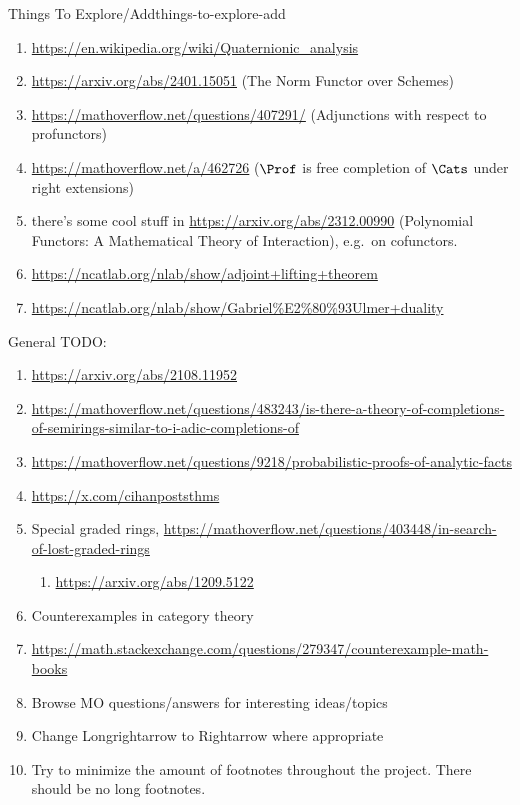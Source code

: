 \begin{remark}{Things To Explore/Add}{things-to-explore-add}
\begin{enumerate}
        \item \url{https://en.wikipedia.org/wiki/Quaternionic\_analysis}
        \item \url{https://arxiv.org/abs/2401.15051} (The Norm Functor over Schemes)
        \item \url{https://mathoverflow.net/questions/407291/} (Adjunctions with respect to profunctors)
        \item \url{https://mathoverflow.net/a/462726} ($\Prof$ is free completion of $\Cats$ under right extensions)
        \item there's some cool stuff in \url{https://arxiv.org/abs/2312.00990} (Polynomial Functors: A Mathematical Theory of Interaction), e.g.\ on cofunctors.
        \item \url{https://ncatlab.org/nlab/show/adjoint+lifting+theorem}
        \item \url{https://ncatlab.org/nlab/show/Gabriel\%E2\%80\%93Ulmer+duality}
    \end{enumerate}
    General TODO:
    \begin{enumerate}
        \item \url{https://arxiv.org/abs/2108.11952}
        \item \url{https://mathoverflow.net/questions/483243/is-there-a-theory-of-completions-of-semirings-similar-to-i-adic-completions-of}
        \item \url{https://mathoverflow.net/questions/9218/probabilistic-proofs-of-analytic-facts}
        \item \url{https://x.com/cihanpoststhms}
        \item Special graded rings, \url{https://mathoverflow.net/questions/403448/in-search-of-lost-graded-rings}
            \begin{enumerate}
                \item \url{https://arxiv.org/abs/1209.5122}
            \end{enumerate}
        \item Counterexamples in category theory
        \item \url{https://math.stackexchange.com/questions/279347/counterexample-math-books}
        \item Browse MO questions/answers for interesting ideas/topics
        \item Change Longrightarrow to Rightarrow where appropriate
        \item Try to minimize the amount of footnotes throughout the project. There should be no long footnotes.
    \end{enumerate}
\end{remark}
\begin{appendices}

\end{appendices}


